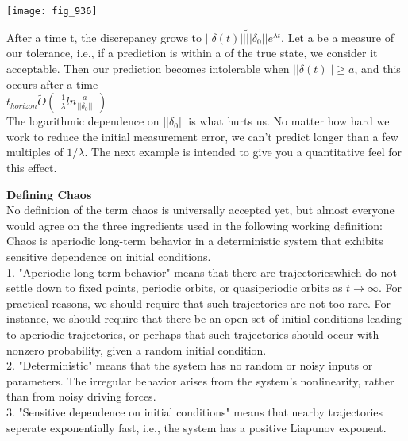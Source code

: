 \documentclass{article}
\newcommand\tab[1][1cm]{\hspace*{#1}}
\begin{document}
\texttt{[image: fig\_936]}

After a time t, the discrepancy grows to $||\delta (t) || \tilde ||\delta_{0}||e^{\lambda t}$. Let a be a measure of our tolerance, i.e., if a prediction is within a of the true state, we consider it acceptable. Then our prediction becomes intolerable when $||\delta(t)|| \geq a$, and this occurs after a time \\ \tab \tab
${ t_{horizon}\tilde O
\begin{pmatrix}
\frac{1}{\lambda}ln\frac{a}{||\delta_{0}||}
\end{pmatrix}
}$ \\ \tab
The logarithmic dependence on $||\delta_{0}||$ is what hurts us. No matter how hard we work to reduce the initial measurement error, we can't predict longer than a few multiples of $1/\lambda$. The next example is intended to give you a quantitative feel for this effect.

\textbf {Defining Chaos} \\ \tab
No definition of the term chaos is universally accepted yet, but almost everyone would agree on the three ingredients used in the following working definition: \\ \tab \tab
Chaos is aperiodic long-term behavior in a deterministic system that exhibits sensitive dependence on initial conditions. \\ \tab \tab
1. "Aperiodic long-term behavior" means that there are trajectorieswhich do not settle down to fixed points, periodic orbits, or quasiperiodic orbits as $t \to \infty$. For practical reasons, we should require that such trajectories are not too rare. For instance, we should require that there be an open set of initial conditions leading to aperiodic trajectories, or perhaps that such trajectories should occur with nonzero probability, given a random initial condition. \\ \tab \tab
2. "Deterministic" means that the system has no random or noisy inputs or parameters. The irregular behavior arises from the system's nonlinearity, rather than from noisy driving forces. \\ \tab \tab
3. "Sensitive dependence on initial conditions" means that nearby trajectories seperate exponentially fast, i.e., the system has a positive Liapunov exponent.
\end{document}

